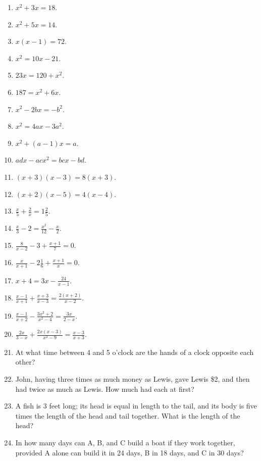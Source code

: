 \documentclass{book}
\begin{document}
\begin{enumerate}
\item $x^{2}+3x=18$.
\item $x^{2}+5x=14$.
\item $x(x-1)=72$.
\item $x^{2}=10x-21$.
\item $23x=120+x^{2}$.
\item $187=x^{2}+6x$.
\item $x^{2}-2bx=-b^{2}$.
\item $x^{2}=4ax-3a^{2}$.
\item $x^{2}+(a-1)x=a$.
\item $adx-acx^{2}=bcx-bd$.
\item $(x+3)(x-3)=8(x+3)$.
\item $(x+2)(x-5)=4(x-4)$.

\item $\displaystyle \frac{x}{5}+\frac{2}{x}=1\frac{2}{5}$.

\item $\displaystyle \frac{x}{3}-2=\frac{x^{2}}{12}-\frac{x}{2}$.

\item $\displaystyle \frac{8}{x-2}-3+\frac{x+1}{7}=0$.

\item $\displaystyle \frac{x}{x+1}-2\frac{1}{6}+\frac{x+1}{x}=0$.

\item $\displaystyle x+4=3x-\frac{24}{x-1}$.

\item $\displaystyle
\frac{x-1}{x+1}+\frac{x+3}{x-3}=\frac{2(x+2)}{x-2}$.

\item $\displaystyle
\frac{x-1}{x+2}-\frac{3x^{2}+2}{x^{2}-4}=\frac{3x}{2-x}$.

\item $\displaystyle
\frac{2x}{3-x}+\frac{2x(x-3)}{x^2-9}=\frac{x-3}{x+3}$.

\item At what time between 4 and 5 o'clock are the hands of a
clock opposite each other?

\item John, having three times as much money as Lewis, gave Lewis
\$2, and then had twice as much as Lewis. How much had each at
first?

\item A fish is 3 feet long; its head is equal in length to the
tail, and its body is five times the length of the head and tail
together. What is the length of the head?

\item In how many days can A, B, and C build a boat
if they work together, provided A alone can build it in
24 days, B in 18 days, and C in 30 days?

\end{enumerate}
\end{document}
